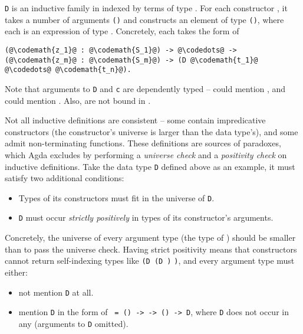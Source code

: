 \texttt{D} is an inductive family in  indexed by terms of type . For each constructor , it takes a number of arguments \texttt{()} and constructs an element of type \texttt{()}, where each  is an expression of type . Concretely, each  takes the form of
\begin{lstlisting}[escapechar=@]
(@\codemath{z_1}@ : @\codemath{S_1}@) -> @\codedots@ -> (@\codemath{z_m}@ : @\codemath{S_m}@) -> (D @\codemath{t_1}@ @\codedots@ @\codemath{t_n}@).
\end{lstlisting}
Note that arguments to \texttt{D} and \texttt{c} are dependently typed --  could mention , and  could mention . Also,  are not bound in .

Not all inductive definitions are consistent -- some contain impredicative constructors (the constructor's universe is larger than the data type's), and some admit non-terminating functions. These definitions are sources of paradoxes, which Agda excludes by performing a \textit{universe check} and a \textit{positivity check} on inductive definitions. Take the data type \texttt{D} defined above as an example, it must satisfy two additional conditions:
\begin{itemize}
  \item Types of its constructors must fit in the universe of \texttt{D}.
  \item \texttt{D} must occur \textit{strictly positively} in types of its constructor's arguments.
\end{itemize}

Concretely, the universe of every argument type  (the type of ) should be smaller than  to pass the universe check. Having strict positivity means that constructors cannot return self-indexing types like \texttt{(D (D \codedots )} \texttt{\codedots )}, and every argument type  must either:
\begin{itemize}
  \item not mention \texttt{D} at all.
  \item mention \texttt{D} in the form of \texttt{ = () -> \codemath{\cdots} -> () -> D}, where \texttt{D} does not occur in any  (arguments to \texttt{D} omitted).
\end{itemize}

